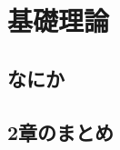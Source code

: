 \documentclass[./_thesis]{subfiles}
\begin{document}
\chapter{基礎理論}
\section{なにか}
\begin{spacing}{2.0}


\section{2章のまとめ}

\end{spacing}
\end{document}
